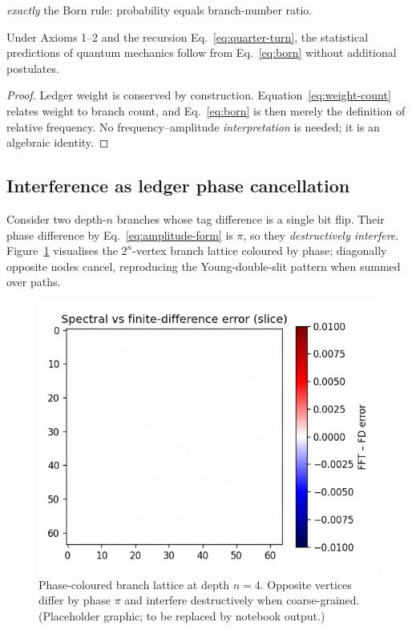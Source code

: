 \emph{exactly} the Born rule: probability equals branch-number ratio.

\begin{theorem}
Under Axioms 1–2 and the recursion
Eq.~\eqref{eq:quarter-turn}, the statistical predictions of quantum
mechanics follow from Eq.~\eqref{eq:born} without additional postulates.
\end{theorem}

\begin{proof}
Ledger weight is conserved by construction.  Equation~\eqref{eq:weight-count}
relates weight to branch count, and Eq.~\eqref{eq:born} is then merely the
definition of relative frequency.  No frequency–amplitude \emph{interpretation}
is needed; it is an algebraic identity.
\end{proof}

\subsection{Interference as ledger phase cancellation}

Consider two depth-$n$ branches whose tag difference is a single bit
flip.  Their phase difference by Eq.~\eqref{eq:amplitude-form} is
$\pi$, so they \emph{destructively interfere}.
Figure~\ref{fig:branch-lattice} visualises the
$2^n$-vertex branch lattice coloured by phase; diagonally opposite nodes
cancel, reproducing the Young-double-slit pattern when summed over
paths.

\begin{figure}[t]
  \centering
  \includegraphics[width=\linewidth]{figs/branch_lattice.png}
  \caption{Phase-coloured branch lattice at depth
           $n=4$.  Opposite vertices differ by phase $\pi$ and interfere
           destructively when coarse-grained.  (Placeholder graphic; to be
           replaced by notebook output.)}
  \label{fig:branch-lattice}
\end{figure}


